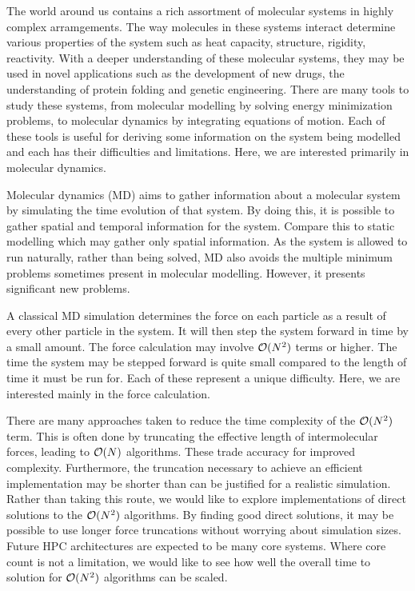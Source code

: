 %
%

%
The world around us contains
a rich assortment of molecular systems in
highly complex arramgements.
%
The way molecules in these systems interact determine various properties
of the system such as heat capacity, structure, rigidity, reactivity.
%
With a deeper understanding of these molecular systems,
they may be used in novel applications such as
the development of new drugs,
the understanding of protein folding and
genetic engineering.
%
There are many tools to study these systems,
from molecular modelling by solving energy minimization problems,
to molecular dynamics by integrating equations of motion.
%
Each of these tools is useful for
deriving some information on the system being modelled and
each has their difficulties and limitations.
%
Here, we are interested primarily in molecular dynamics.

Molecular dynamics (MD) aims to
gather information about a molecular system by
simulating the time evolution of that system.
%
By doing this, it is possible to
gather spatial and temporal information for the system.
%
Compare this to static modelling which may gather only spatial information.
%
As the system is allowed to run naturally, rather than being solved,
MD also avoids the multiple minimum problems
sometimes present in molecular modelling.
%
However, it presents significant new problems.


%
A classical MD simulation determines
the force on each particle as a result of
every other particle in the system.
%
It will then step the system forward in time by a small amount.
%
The force calculation may involve $\mathcal{O}{(N^2)}$ terms or higher.
%
The time the system may be stepped forward is
quite small compared to the length of time it must be run for.
%
Each of these represent a unique difficulty.
%
Here, we are interested mainly in the force calculation.


There are many approaches taken to reduce the time complexity of
the $\mathcal{O}{(N^2)}$ term.
%
This is often done by truncating the effective length of intermolecular
forces, leading to $\mathcal{O}{(N)}$ algorithms.
%
These trade accuracy for improved complexity.
%
Furthermore, the truncation necessary to achieve an efficient implementation
may be shorter than can be justified for a realistic simulation.
%
Rather than taking this route, we would like to explore implementations
of direct solutions to the $\mathcal{O}{(N^2)}$ algorithms.
%
By finding good direct solutions, it may be possible to use longer force
truncations without worrying about simulation sizes.
%
Future HPC architectures are expected to be many core systems.
%
Where core count is not a limitation, we would like to see how well
the overall time to solution for $\mathcal{O}{(N^2)}$ algorithms can be scaled.


